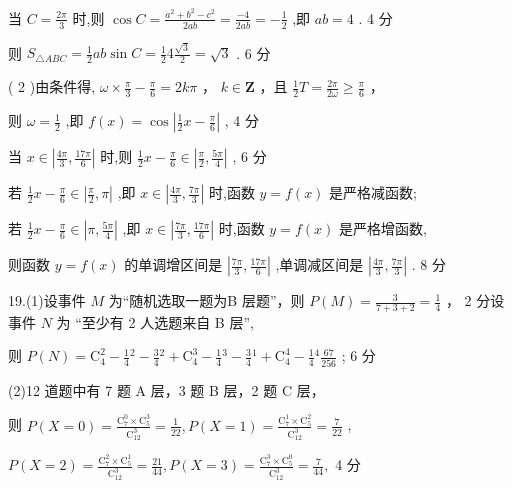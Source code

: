 \documentclass[10pt]{article}
\begin{document}
当 \(C = \frac{2\pi }{3}\) 时,则 \(\cos C = \frac{{a}^{2} + {b}^{2} - {c}^{2}}{2ab} = \frac{-4}{2ab} =  - \frac{1}{2}\) ,即 \({ab} = 4\) . 4 分

则 \({S}_{\bigtriangleup {ABC}} = \frac{1}{2}{ab}\sin C = \frac{1}{2}4\frac{\sqrt{3}}{2} = \sqrt{3}\) . 6 分

( 2 )由条件得, \(\omega  \times  \frac{\pi }{3} - \frac{\pi }{6} = {2k\pi }\) ， \(k \in  \mathbf{Z}\) ，且 \(\frac{1}{2}T = \frac{2\pi }{2\omega } \geq  \frac{\pi }{6}\) ，

则 \(\omega  = \frac{1}{2}\) ,即 \(f\left( x\right)  = \cos \left| {\frac{1}{2}x - \frac{\pi }{6}}\right|\) , 4 分

当 \(x \in  \left| {\frac{4\pi }{3},\frac{17\pi }{6}}\right|\) 时,则 \(\frac{1}{2}x - \frac{\pi }{6} \in  \left| {\frac{\pi }{2},\frac{5\pi }{4}}\right|\) , 6 分

若 \(\frac{1}{2}x - \frac{\pi }{6} \in  \left| {\frac{\pi }{2},\pi }\right|\) ,即 \(x \in  \left| {\frac{4\pi }{3},\frac{7\pi }{3}}\right|\) 时,函数 \(y = f\left( x\right)\) 是严格减函数;

若 \(\frac{1}{2}x - \frac{\pi }{6} \in  \left| {\pi ,\frac{5\pi }{4}}\right|\) ,即 \(x \in  \left| {\frac{7\pi }{3},\frac{17\pi }{6}}\right|\) 时,函数 \(y = f\left( x\right)\) 是严格增函数,

则函数 \(y = f\left( x\right)\) 的单调增区间是 \(\left| {\frac{7\pi }{3},\frac{17\pi }{6}}\right|\) ,单调减区间是 \(\left| {\frac{4\pi }{3},\frac{7\pi }{3}}\right|\) . 8 分

19.(1)设事件 \(M\) 为“随机选取一题为B 层题”，则 \(P\left( M\right)  = \frac{3}{7 + 3 + 2} = \frac{1}{4}\) ， 2 分设事件 \(N\) 为 “至少有 2 人选题来自 B 层”,

则 \(P\left( N\right)  = {\mathrm{C}}_{4}^{2} - \frac{1}{4}{}^{2} - \frac{3}{4}{}^{2} + {\mathrm{C}}_{4}^{3} - \frac{1}{4}{}^{3} - \frac{3}{4}{}^{1} + {\mathrm{C}}_{4}^{4} - \frac{1}{4}{}^{4}\frac{67}{256}\) ; 6 分

(2)12 道题中有 7 题 A 层，3 题 B 层，2 题 C 层，

则 \(P\left( {X = 0}\right)  = \frac{{\mathrm{C}}_{7}^{0} \times  {\mathrm{C}}_{5}^{3}}{{\mathrm{C}}_{12}^{3}} = \frac{1}{22},P\left( {X = 1}\right)  = \frac{{\mathrm{C}}_{7}^{1} \times  {\mathrm{C}}_{5}^{2}}{{\mathrm{C}}_{12}^{3}} = \frac{7}{22}\) ,

\(P\left( {X = 2}\right)  = \frac{{\mathrm{C}}_{7}^{2} \times  {\mathrm{C}}_{5}^{1}}{{\mathrm{C}}_{12}^{3}} = \frac{21}{44},P\left( {X = 3}\right)  = \frac{{\mathrm{C}}_{7}^{3} \times  {\mathrm{C}}_{5}^{0}}{{\mathrm{C}}_{12}^{3}} = \frac{7}{44},\) 4 分
\end{document}
